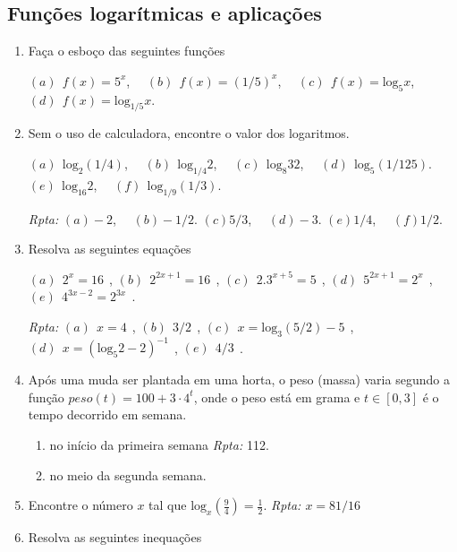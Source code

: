 \documentclass[11pt]{article}
\begin{document}
    \subsection{Funções logarítmicas e aplicações }
     \begin{enumerate}
      \item Faça o esboço das seguintes funções 
      
        $(a) \ \ f(x)=5^{x}$, \ \ 
        $(b) \ \ f(x)=(1/5)^{x}$, \ \ 
        $(c) \ \ f(x)= \text{log}_{5}x$, \ \ 
        $(d) \ \ f(x)= \text{log}_{1/5} x$. 
      \item Sem o uso de calculadora, encontre o valor dos logaritmos. 
     
        $(a) \ \ \text{log}_{2} (1/4)$, \ \ 
        $(b) \ \ \text{log}_{1/4} 2$, \ \     
        $(c) \ \ \text{log}_{8} 32$, \ \ 
        $(d) \ \ \text{log}_{5} (1/125)$.
        $(e) \ \ \text{log}_{16} 2$, \ \ 
        $(f) \ \ \text{log}_{1/9} (1/3)$. 
        
        {\it Rpta: }
        $(a) -2$, \ \ 
        $(b) -1/2$.    
        $(c) 5/3$, \ \ 
        $(d) -3$.
        $(e) 1/4$, \ \ 
        $(f) 1/2$.    
      \item Resolva as seguintes equações 
      
      $(a) \ \ 2^{x}=16 \ \ $,  
      $(b) \ \ 2^{2x+1}=16 \ \ $,      
      $(c) \ \ 2. 3^{x+5}=5 \ \ $,  
      $(d) \ \ 5^{2x+1}=2^{x} \ \ $,
      $(e) \ \ 4^{3x-2}=2^{3x} \ \ $.   
      
      {\it Rpta: }
      $(a) \ \ x=4  \ \ $,  
      $(b) \ \ 3/2 \ \ $,      
      $(c) \ \ x=\text{log}_{3}(5/2)-5 \ \ $,  
      $(d) \ \ x=(\text{log}_{5}2-2)^{-1} \ \ $,
      $(e) \ \ 4/3 \ \ $.  
      \item Após uma muda ser plantada em uma horta, o peso (massa) varia segundo a função $peso(t)=100+3\cdot 4^{t}$, onde o peso está em grama e $t \in [0,3]$ é o tempo decorrido em semana. 
           \begin{enumerate}
           	\item no início da primeira semana
           	      \hfill {\it Rpta: } 112. 
           	\item no meio da segunda semana. 
           \end{enumerate}
      \item Encontre o número $x$ tal que 
      $\text{log}_{x}(\frac{9}{4})=\frac{1}{2}$.
      \hfill {\it Rpta: $x=81/16$}  
      \item Resolva as seguintes inequações 
      

\end{enumerate}
\end{document}
